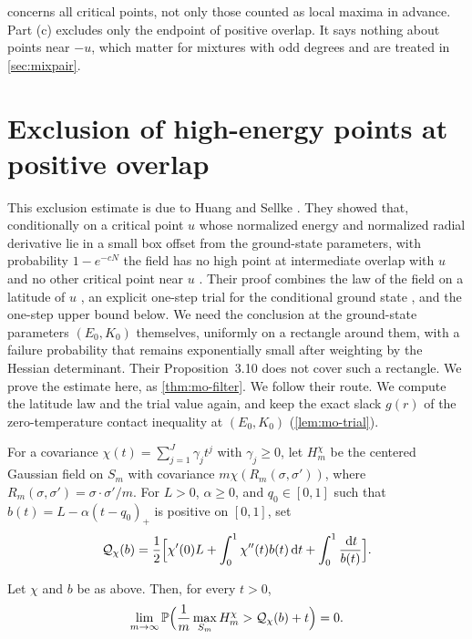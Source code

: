  concerns all critical points, not only those counted as local maxima in advance. Part (c) excludes only the endpoint of positive overlap. It says nothing about points near $-u$, which matter for mixtures with odd degrees and are treated in \cref{sec:mixpair}.


\section{Exclusion of high-energy points at positive overlap}\label{sec:mo-filter}

This exclusion estimate is due to Huang and Sellke \cite[Section~3.3]{HuangSellke2024}. They showed that, conditionally on a critical point $u$ whose normalized energy and normalized radial derivative lie in a small box offset from the ground-state parameters, with probability $1-e^{-cN}$ the field has no high point at intermediate overlap with $u$ and no other critical point near $u$ \cite[Proposition~3.10]{HuangSellke2024}. Their proof combines the law of the field on a latitude of $u$ \cite[Lemma~3.11]{HuangSellke2024}, an explicit one-step trial for the conditional ground state \cite[Proposition~3.13]{HuangSellke2024}, and the one-step upper bound below. We need the conclusion at the ground-state parameters $(E_0,K_0)$ themselves, uniformly on a rectangle around them, with a failure probability that remains exponentially small after weighting by the Hessian determinant. Their Proposition~3.10 does not cover such a rectangle. We prove the estimate here, as \cref{thm:mo-filter}. We follow their route. We compute the latitude law and the trial value again, and keep the exact slack $g(r)$ of the zero-temperature contact inequality at $(E_0,K_0)$ (\cref{lem:mo-trial}).

For a covariance $\chi(t)=\sum_{j=1}^J\gamma_jt^j$ with $\gamma_j\ge0$, let $H_m^\chi$ be the centered Gaussian field on $S_m$ with covariance $m\chi(R_m(\sigma,\sigma'))$, where $R_m(\sigma,\sigma')=\sigma\cdot\sigma'/m$. For $L>0$, $\alpha\ge0$, and $q_0\in[0,1]$ such that $b(t)=L-\alpha(t-q_0)_+$ is positive on $[0,1]$, set
\begin{equation}\label{eq:mo-Qtrial}
\mathcal Q_\chi(b)=\frac12\Bigl[\chi'(0)L+\int_0^1\chi''(t)b(t)\,\mathrm d t+\int_0^1\frac{\,\mathrm d t}{b(t)}\Bigr].
\end{equation}

\begin{theorem}\label{thm:mo-HS}
Let $\chi$ and $b$ be as above. Then, for every $t>0$,
\[
\lim_{m\to\infty}\mathbb P\Bigl(\frac1m\max_{S_m}H_m^\chi>\mathcal Q_\chi(b)+t\Bigr)=0.
\]
\end{theorem}

